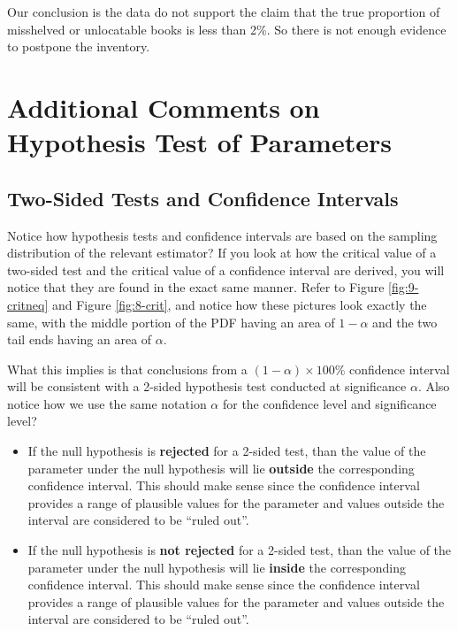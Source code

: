 \documentclass[
]{book}
\begin{document}
Our conclusion is the data do not support the claim that the true proportion of misshelved or unlocatable books is less than 2\%. So there is not enough evidence to postpone the inventory.

\section{Additional Comments on Hypothesis Test of Parameters}\label{additional-comments-on-hypothesis-test-of-parameters}

\subsection{Two-Sided Tests and Confidence Intervals}\label{inference}

Notice how hypothesis tests and confidence intervals are based on the sampling distribution of the relevant estimator? If you look at how the critical value of a two-sided test and the critical value of a confidence interval are derived, you will notice that they are found in the exact same manner. Refer to Figure \ref{fig:9-critneq} and Figure \ref{fig:8-crit}, and notice how these pictures look exactly the same, with the middle portion of the PDF having an area of \(1-\alpha\) and the two tail ends having an area of \(\alpha\).

What this implies is that conclusions from a \((1-\alpha) \times 100\%\) confidence interval will be consistent with a 2-sided hypothesis test conducted at significance \(\alpha\). Also notice how we use the same notation \(\alpha\) for the confidence level and significance level?

\begin{itemize}
\item
  If the null hypothesis is \textbf{rejected} for a 2-sided test, than the value of the parameter under the null hypothesis will lie \textbf{outside} the corresponding confidence interval. This should make sense since the confidence interval provides a range of plausible values for the parameter and values outside the interval are considered to be ``ruled out''.
\item
  If the null hypothesis is \textbf{not rejected} for a 2-sided test, than the value of the parameter under the null hypothesis will lie \textbf{inside} the corresponding confidence interval. This should make sense since the confidence interval provides a range of plausible values for the parameter and values outside the interval are considered to be ``ruled out''.
\end{itemize}
\end{document}
